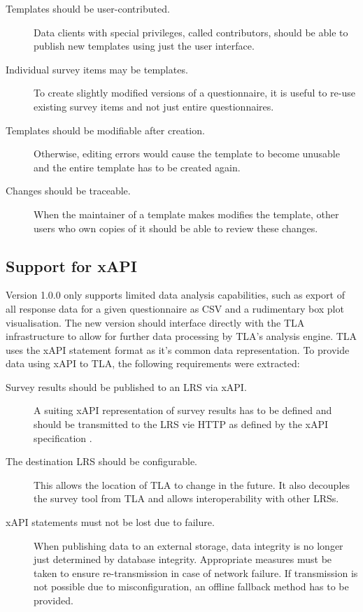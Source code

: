 \documentclass[a4paper,11pt]{article}
\begin{document}
            \begin{description}
                \item[Templates should be user-contributed.] Data clients with special
                privileges, called contributors, should be able to publish new templates
                using just the user interface.
                \item[Individual survey items may be templates.] To create slightly modified
                versions of a questionnaire, it is useful to re-use existing survey items and not
                just entire questionnaires.
                \item[Templates should be modifiable after creation.] Otherwise, editing
                errors would cause the template to become unusable and the entire template
                has to be created again.
                \item[Changes should be traceable.] When the maintainer of a template makes 
                modifies the template, other users who own copies of it should be able to 
                review these changes.
            \end{description}

        \subsection{Support for xAPI}
            Version 1.0.0 only supports limited data analysis capabilities, such as export
            of all response data for a given questionnaire as CSV and a rudimentary
            box plot visualisation. The new version should interface directly with the TLA 
            infrastructure to allow for further data processing by TLA's analysis engine. 
            TLA uses the xAPI statement format as it's common data representation. To provide data
            using xAPI to TLA, the following requirements were extracted:

            \begin{description}
                \item[Survey results should be published to an LRS via xAPI.] A suiting xAPI 
                representation of survey results has to be defined and should be transmitted
                to the LRS vie HTTP as defined by the xAPI specification \cite{xapi-spec}.
                \item[The destination LRS should be configurable.] This allows the location
                of TLA to change in the future. It also decouples the survey tool from TLA 
                and allows interoperability with other LRSs.
                \item[xAPI statements must not be lost due to failure.] When publishing data
                to an external storage, data integrity is no longer just determined by
                database integrity. Appropriate measures must be taken to ensure 
                re-transmission in case of network failure. If transmission is not possible
                due to misconfiguration, an offline fallback method has to be provided.
            \end{description}
\end{document}
